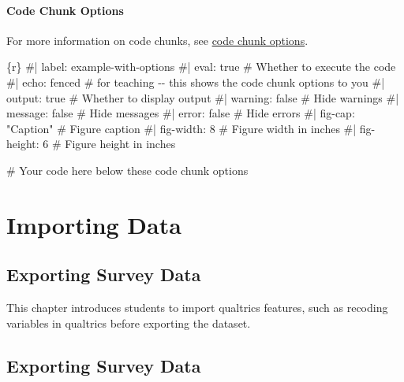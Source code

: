 \documentclass[
  english,
  letterpaper,
  DIV=11,
  numbers=noendperiod]{scrreprt}
\newenvironment{Shaded}{\begin{snugshade}}{\end{snugshade}}
\newcommand{\CommentTok}[1]{\textcolor[rgb]{0.37,0.37,0.37}{#1}}
\newcommand{\InformationTok}[1]{\textcolor[rgb]{0.37,0.37,0.37}{#1}}
\begin{document}
\subsection{Code Chunk Options}\label{code-chunk-options}

For more information on code chunks, see
\href{https://r4ds.hadley.nz/quarto.html\#chunk-options}{code chunk
options}.

\begin{Shaded}
\begin{Highlighting}[]
\InformationTok{\textasciigrave{}\textasciigrave{}\textasciigrave{}\{r\}}
\CommentTok{\#| label: example{-}with{-}options}
\CommentTok{\#| eval: true          \# Whether to execute the code}
\CommentTok{\#| echo: fenced        \# for teaching {-}{-} this shows the code chunk options to you}
\CommentTok{\#| output: true        \# Whether to display output}
\CommentTok{\#| warning: false      \# Hide warnings}
\CommentTok{\#| message: false      \# Hide messages}
\CommentTok{\#| error: false        \# Hide errors}
\CommentTok{\#| fig{-}cap: "Caption"  \# Figure caption}
\CommentTok{\#| fig{-}width: 8        \# Figure width in inches}
\CommentTok{\#| fig{-}height: 6       \# Figure height in inches}

\CommentTok{\# Your code here below these code chunk options}
\InformationTok{\textasciigrave{}\textasciigrave{}\textasciigrave{}}
\end{Highlighting}
\end{Shaded}

\part{Importing Data}

\chapter{Exporting Survey Data}\label{exporting-survey-data}

This chapter introduces students to import qualtrics features, such as
recoding variables in qualtrics before exporting the dataset.

\hfill\break

\chapter{Exporting Survey Data}\label{exporting-survey-data-1}
\end{document}
